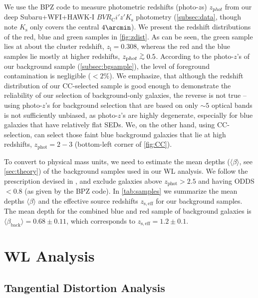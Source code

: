 \documentclass[iop,twocolumn]{emulateapj}
\newcommand{\simgt}{\lower.5ex\hbox{$\; \buildrel > \over \sim \;$}}
\begin{document}
% 
We use the {\sc BPZ} code to measure photometric
redshifts (photo-$z$s) $z_{\mathrm phot}$ from our  
deep Subaru+WFI+HAWK-I $BVR_{\mathrm C}i'z'K_{\mathrm s}$ photometry (\autoref{subsec:data}, though note $K_{\mathrm s}$ only covers the central $4\arcmin$). We present the redshift distributions of the red, blue and green samples in \autoref{fig:zdist}. As can be seen, the green sample lies at about the cluster redshift, $z_{\mathrm l}=0.308$, whereas the red and the blue samples lie mostly at higher redshifts, $z_{\mathrm phot}\simgt0.5$. According to the photo-$z$'s of our background sample (\autoref{subsec:bgsample}), the level of foreground contamination is negligible ($<2\%$). We emphasize, that although the redshift distribution of our CC-selected sample is good enough to demonstrate the reliability of our selection of background-only galaxies, the reverse is not true -- using photo-$z$'s for background selection that are based on only $\sim5$ optical bands is not sufficiently unbiased, as photo-$z$'s are highly degenerate, especially for blue galaxies that have relatively flat SEDs. We, on the other hand, using CC-selection, can select those faint blue background galaxies that lie at high redshifts, $z_\mathrm{phot}=2-3$  (bottom-left corner of \autoref{fig:CC}).
 
To convert to physical mass units, we need to estimate the mean depths ($\langle\beta\rangle$, see \autoref{sec:theory}) of the background samples used in our WL analysis. We follow the prescription devised in \cite{Umetsu2014}, and exclude galaxies above $z_\mathrm{phot}>2.5$ and having ODDS$<0.8$ (as given by the BPZ code). In \autoref{tab:samples} we summarize the mean depths 
$\langle\beta \rangle$ and the effective source redshifts 
$z_\mathrm{s,eff}$ for our background samples.
The mean depth for the combined blue and red sample of background galaxies is $\langle\beta_\mathrm{back}\rangle=0.68\pm 0.11$, which corresponds to $z_\mathrm{ s,eff}=1.2\pm 0.1$. 
 









\section{WL Analysis}
\label{sec:WL}

\subsection{Tangential Distortion Analysis}
\label{subsec:gt}
\end{document}

